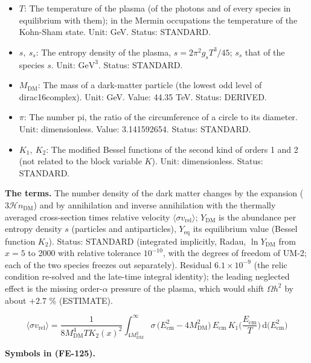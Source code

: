 \documentclass[
  10pt,
]{article}
\begin{document}
\begin{itemize}
\item
  \(T\): The temperature of the plasma (of the photons and of every
  species in equilibrium with them); in the Mermin occupations the
  temperature of the Kohn-Sham state. Unit: GeV. Status: STANDARD.
\item
  \(s,\ s_s\): The entropy density of the plasma,
  \(s = 2\pi^2g_sT^3/45\); \(s_s\) that of the species \(s\). Unit:
  \(\mathrm{GeV}^{3}\). Status: STANDARD.
\item
  \(M_{\mathrm{DM}}\): The mass of a dark-matter particle (the lowest
  odd level of dirac16complex). Unit: GeV. Value: 44.35 TeV. Status:
  DERIVED.
\item
  \(\pi\): The number pi, the ratio of the circumference of a circle to
  its diameter. Unit: dimensionless. Value: 3.141592654. Status:
  STANDARD.
\item
  \(K_1,\ K_2\): The modified Bessel functions of the second kind of
  orders 1 and 2 (not related to the block variable \(K\)). Unit:
  dimensionless. Status: STANDARD.
\end{itemize}

\textbf{The terms.} The number density of the dark matter changes by the
expansion (\(3\mathcal{H}n_{\mathrm{DM}}\)) and by annihilation and
inverse annihilation with the thermally averaged cross-section times
relative velocity \(\langle\sigma v_{\mathrm{rel}}\rangle\);
\(Y_{\mathrm{DM}}\) is the abundance per entropy density \(s\)
(particles and antiparticles), \(Y_{\mathrm{eq}}\) its equilibrium value
(Bessel function \(K_2\)). Status: STANDARD (integrated implicitly,
Radau, \(\ln Y_{\mathrm{DM}}\) from \(x = 5\) to 2000 with relative
tolerance \(10^{-10}\), with the degrees of freedom of UM-2; each of the
two species freezes out separately). Residual \(6.1\times10^{-9}\) (the
relic condition re-solved and the late-time integral identity); the
leading neglected effect is the missing order-\(\alpha\) pressure of the
plasma, which would shift \(\Omega h^2\) by about \(+2.7\) \%
(ESTIMATE).

\[
\langle\sigma v_{\mathrm{rel}}\rangle =
 \frac{1}{8M_{\mathrm{DM}}^4TK_2(x)^2}\int_{4M_{\mathrm{DM}}^2}^{\infty}\sigma\,
 \big(E_{\mathrm{cm}}^2 - 4M_{\mathrm{DM}}^2\big)\,E_{\mathrm{cm}}\,K_1\Big(\frac{E_{\mathrm{cm}}}{T}\Big)\,
 \mathrm{d}\big(E_{\mathrm{cm}}^2\big) \tag{FE-125}
\]

\textbf{Symbols in (FE-125).}
\end{document}
